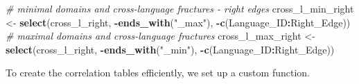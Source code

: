\documentclass[
]{article}
\newenvironment{Shaded}{\begin{snugshade}}{\end{snugshade}}
\newcommand{\CommentTok}[1]{\textcolor[rgb]{0.56,0.35,0.01}{\textit{#1}}}
\newcommand{\FunctionTok}[1]{\textcolor[rgb]{0.13,0.29,0.53}{\textbf{#1}}}
\newcommand{\NormalTok}[1]{#1}
\newcommand{\OtherTok}[1]{\textcolor[rgb]{0.56,0.35,0.01}{#1}}
\newcommand{\SpecialCharTok}[1]{\textcolor[rgb]{0.81,0.36,0.00}{\textbf{#1}}}
\newcommand{\StringTok}[1]{\textcolor[rgb]{0.31,0.60,0.02}{#1}}
\begin{document}
\begin{Shaded}
\begin{Highlighting}[]
\CommentTok{\# minimal domains and cross{-}language fractures {-} right edges}
\NormalTok{cross\_l\_min\_right }\OtherTok{\textless{}{-}} \FunctionTok{select}\NormalTok{(cross\_l\_right, }\SpecialCharTok{{-}}\FunctionTok{ends\_with}\NormalTok{(}\StringTok{"\_max"}\NormalTok{), }\SpecialCharTok{{-}}\FunctionTok{c}\NormalTok{(Language\_ID}\SpecialCharTok{:}\NormalTok{Right\_Edge))}
\CommentTok{\# maximal domains and cross{-}language fractures}
\NormalTok{cross\_l\_max\_right }\OtherTok{\textless{}{-}} \FunctionTok{select}\NormalTok{(cross\_l\_right, }\SpecialCharTok{{-}}\FunctionTok{ends\_with}\NormalTok{(}\StringTok{"\_min"}\NormalTok{), }\SpecialCharTok{{-}}\FunctionTok{c}\NormalTok{(Language\_ID}\SpecialCharTok{:}\NormalTok{Right\_Edge))}
\end{Highlighting}
\end{Shaded}

To create the correlation tables efficiently, we set up a custom
function.
\end{document}
